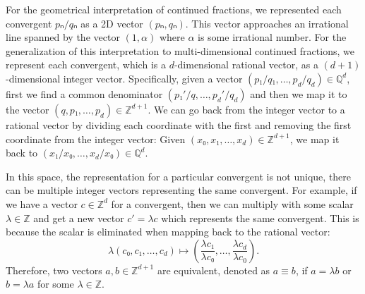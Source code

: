 For the geometrical interpretation of continued fractions,
we represented each convergent $pₙ/qₙ$ as a 2D vector $(pₙ, qₙ)$.
This vector approaches an irrational line spanned by the vector $(1, α)$ where
$α$ is some irrational number.
For the generalization of this interpretation to multi-dimensional continued
fractions, we represent each convergent, which is a $d$-dimensional rational vector,
as a $(d+1)$-dimensional integer vector.
Specifically, given a vector $(p₁/q₁, …, p_d/q_d) ∈ ℚ^d$, first we find a
common denominator $(p₁'/q, …, p_d'/q_d)$ and then we map it to the vector
$(q, p₁, …, p_d) ∈ ℤ^{d+1}$.
We can go back from the integer vector to a rational vector by dividing each
coordinate with the first and removing the first coordinate from the integer
vector:
Given $(x₀, x₁, …, x_d) ∈ ℤ^{d+1}$, we map it back to $(x₁/x₀, …, x_d/x₀) ∈ ℚ^d$.

In this space, the representation for a particular convergent is not unique,
there can be multiple integer vectors representing the same convergent.
For example, if we have a vector $c ∈ ℤ^d$ for a convergent,
then we can multiply with some scalar $λ ∈ ℤ$ and get a new vector $c' = λ c$
which represents the same convergent.
This is because the scalar is eliminated when mapping back to the rational vector:
\[
  λ (c₀, c₁, …, c_d) ↦  \left(\frac{λ c₁}{λ c₀}, …, \frac{λ c_d}{λ c_0} \right).
\]
Therefore, two vectors $a, b ∈ ℤ^{d+1}$ are equivalent, denoted as $a ≡ b$,
if $a = λ b$ or $b = λ a$ for some $λ ∈ ℤ$.




\begin{center}
\end{center}

